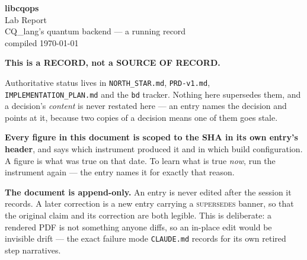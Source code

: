 \documentclass[11pt,a4paper]{article}
\begin{document}
\thispagestyle{empty}
\begin{center}
  \vspace*{18mm}
  {\Huge\bfseries\color{cqaccent} libcqops}\\[3mm]
  {\LARGE Lab Report}\\[10mm]
  {\large\color{cqsoft} CQ\_lang's quantum backend --- a running record}\\[3mm]
  {\color{cqsoft}\small compiled \today}
\end{center}

\vspace{14mm}

\noindent\colorbox{cqbg}{%
\begin{minipage}{\dimexpr\linewidth-2\fboxsep}
\vspace{3mm}
{\bfseries This is a RECORD, not a SOURCE OF RECORD.}

\medskip
Authoritative status lives in \texttt{NORTH\_STAR.md}, \texttt{PRD-v1.md},
\texttt{IMPLEMENTATION\_PLAN.md} and the \texttt{bd} tracker. Nothing here
supersedes them, and a decision's \emph{content} is never restated here --- an
entry names the decision and points at it, because two copies of a decision
means one of them goes stale.

\medskip
{\bfseries Every figure in this document is scoped to the SHA in its own
entry's header}, and says which instrument produced it and in which build
configuration. A figure is what was true on that date. To learn what is true
\emph{now}, run the instrument again --- the entry names it for exactly that
reason.

\medskip
{\bfseries The document is append-only.} An entry is never edited after the
session it records. A later correction is a new entry carrying a
\textsc{supersedes} banner, so that the original claim and its correction are
both legible. This is deliberate: a rendered PDF is not something anyone diffs,
so an in-place edit would be invisible drift --- the exact failure mode
\texttt{CLAUDE.md} records for its own retired step narratives.
\vspace{3mm}
\end{minipage}}

\vspace{10mm}

\end{document}
